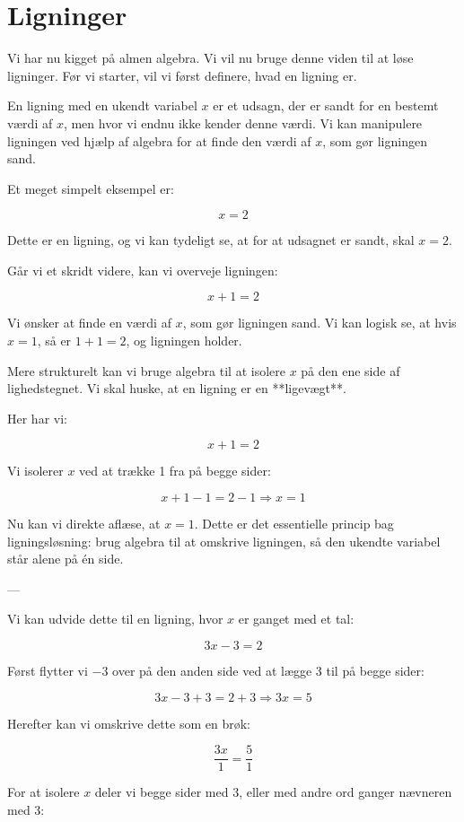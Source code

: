 \section{Ligninger}

Vi har nu kigget på almen algebra. Vi vil nu bruge denne viden til at løse ligninger. Før vi starter, vil vi først definere, hvad en ligning er.

En ligning med en ukendt variabel $x$ er et udsagn, der er sandt for en bestemt værdi af $x$, men hvor vi endnu ikke kender denne værdi. Vi kan manipulere ligningen ved hjælp af algebra for at finde den værdi af $x$, som gør ligningen sand.

Et meget simpelt eksempel er:

\[
x = 2
\]

Dette er en ligning, og vi kan tydeligt se, at for at udsagnet er sandt, skal $x = 2$.

Går vi et skridt videre, kan vi overveje ligningen:

\[
x + 1 = 2
\]

Vi ønsker at finde en værdi af $x$, som gør ligningen sand. Vi kan logisk se, at hvis $x = 1$, så er $1 + 1 = 2$, og ligningen holder.  

Mere strukturelt kan vi bruge algebra til at isolere $x$ på den ene side af lighedstegnet. Vi skal huske, at en ligning er en **ligevægt**.

Her har vi:

\[
x + 1 = 2
\]

Vi isolerer $x$ ved at trække 1 fra på begge sider:

\[
x + 1 - 1 = 2 - 1 \Rightarrow x = 1
\]

Nu kan vi direkte aflæse, at $x = 1$. Dette er det essentielle princip bag ligningsløsning: brug algebra til at omskrive ligningen, så den ukendte variabel står alene på én side.

---

Vi kan udvide dette til en ligning, hvor $x$ er ganget med et tal:

\[
3x - 3 = 2
\]

Først flytter vi $-3$ over på den anden side ved at lægge 3 til på begge sider:

\[
3x - 3 + 3 = 2 + 3 \Rightarrow 3x = 5
\]

Herefter kan vi omskrive dette som en brøk:

\[
\frac{3x}{1} = \frac{5}{1}
\]

For at isolere $x$ deler vi begge sider med 3, eller med andre ord ganger nævneren med 3:

